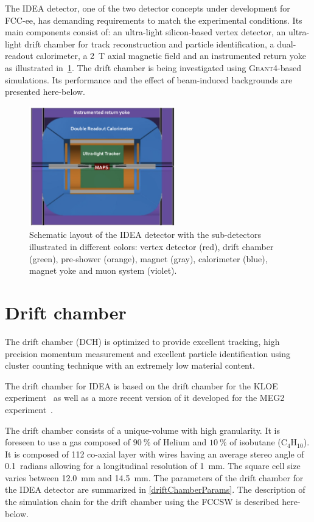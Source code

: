 \documentclass[conference]{IEEEtran}
\begin{document}
The IDEA detector, one of the two detector concepts under development for FCC-ee, has demanding requirements to match the experimental conditions. Its main components consist of: an ultra-light silicon-based vertex detector, an ultra-light drift chamber for track reconstruction and particle identification, a dual-readout calorimeter, a 2~T axial magnetic field and an instrumented return yoke as illustrated in~\cref{fig_IDEA}. The drift chamber is being investigated using \textsc{Geant4}-based simulations. Its performance and the effect of beam-induced backgrounds are presented here-below.

\begin{figure}[!h]
	\centering
	\includegraphics[width=2.5in]{figures/FCCeeIDEAConcept}%
	\caption{Schematic layout of the IDEA detector with the sub-detectors illustrated in different colors: vertex detector (red), drift chamber (green), pre-shower (orange), magnet (gray), calorimeter (blue), magnet yoke and muon system (violet).}
	\label{fig_IDEA}
\end{figure}


\section{Drift chamber}
The drift chamber (DCH) is optimized to provide excellent tracking, high precision momentum measurement and excellent particle identification using cluster counting technique with an extremely low material content.

The drift chamber for IDEA is based on the drift chamber for the KLOE experiment~\cite{DeLucia:2018qoc} as well as a more recent version of it developed for the MEG2 experiment~\cite{Baldini:2018nnn}.

The drift chamber consists of a unique-volume with high granularity. It is foreseen to use a gas composed of $90~\%$ of Helium and $10~\%$ of isobutane ($\text{C}_{4}\text{H}_{10}$). It is composed of 112 co-axial layer with wires having an average stereo angle of 0.1~radians allowing for a longitudinal resolution of 1~mm. The square cell size varies between 12.0~mm and 14.5~mm. The parameters of the drift chamber for the IDEA detector are summarized in \cref{driftChamberParams}. The description of the simulation chain for the drift chamber using the FCCSW is described here-below.
\end{document}
